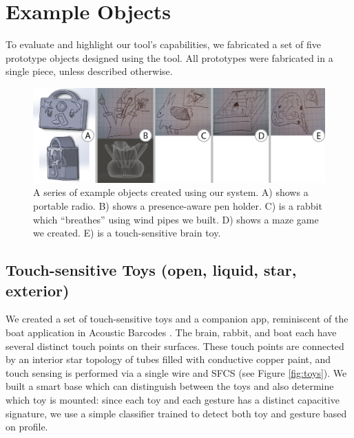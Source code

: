 \section{Example Objects}

To evaluate and highlight our tool's capabilities, we fabricated a set of five prototype objects designed using the tool.  All prototypes were fabricated in a single piece, unless described otherwise.

\begin{figure}[h!]
\centering
    \includegraphics[width=7in]{figures/examples.png}
\caption{A series of example objects created using our system.  A) shows a portable radio.  B) shows a presence-aware pen holder.  C) is a rabbit which ``breathes'' using wind pipes we built.  D) shows a maze game we created.  E) is a touch-sensitive brain toy.  }
\label{fig:examples}
\end{figure}

 

\subsection{Touch-sensitive Toys (open, liquid, star, exterior)}


We created a set of touch-sensitive toys and a companion app, reminiscent of the boat application in Acoustic Barcodes \cite{Harrison-acoustic}.  The brain, rabbit, and boat each have several distinct touch points on their surfaces.  These touch points are connected by an interior star topology of tubes filled with conductive copper paint, and touch sensing is performed via a single wire and SFCS (see Figure \ref{fig:toys}).  We built a smart base which can distinguish between the toys and also determine which toy is mounted: since each toy and each gesture has a distinct capacitive signature, we use a simple classifier trained to detect both toy and gesture based on profile.

